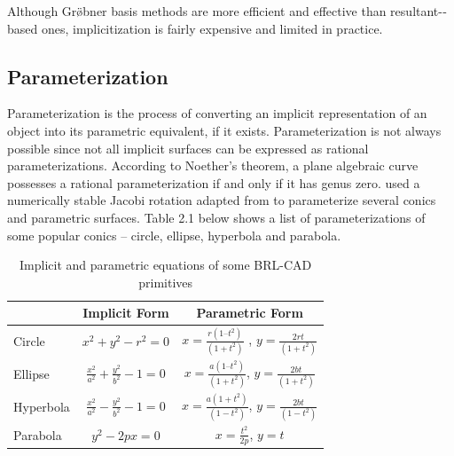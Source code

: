 Although Gr\"\o bner basis methods are more efficient and effective than
resultant-­based ones, implicitization is fairly expensive and limited in practice.  




\subsection{Parameterization}

Parameterization is the process of converting an implicit representation of 
an object into its parametric equivalent, if it exists. Parameterization is not
always possible since not all implicit surfaces can be expressed as rational
parameterizations. According to Noether's theorem, a plane algebraic curve
possesses a rational parameterization if and only if it has genus zero. \cite{13} used
a numerically stable Jacobi rotation adapted from \cite{12} to parameterize several
conics and parametric surfaces. Table 2.1 below shows a list of
parameterizations of some popular conics – circle, ellipse, hyperbola and
parabola.
\begin{table}[thbp]
\caption[Implicit and parametric equations of some BRL-­CAD primitives]{Implicit and parametric equations of some BRL­-CAD primitives}
\centering
\begin{tabular}{| l | c | c |}
  \hline
   & Implicit Form & Parametric Form &  \\
  \hline
  Circle & $x^2 + y^2 - r^2 = 0$ &    $x =  \frac{r(1 – t^2)}{(1 + t^2)}$ , $y = \frac{2rt}{(1 + t^2)}$ \\
  \hline
  Ellipse & $\frac{x^2}{a^2} + \frac{y^2}{b^2} - 1 = 0$ &     $x = \frac{a(1 – t^2)}{(1 + t^2)}$, $y = \frac{2bt}{(1 + t^2)}$ \\
  \hline
  Hyperbola & $\frac{x^2}{a^2} - \frac{y^2}{b^2} - 1 = 0$ &     $x = \frac{a(1 + t^2)}{(1 - t^2)}$, $y = \frac{2bt}{(1 - t^2)}$ \\
  \hline
  Parabola & $y^2 - 2px = 0$ &     $ x = \frac{t^2}{2p}$, $ y = t$ \\
  \hline
\end{tabular}
\label{Implicit and Parametric equations}
\end{table}

